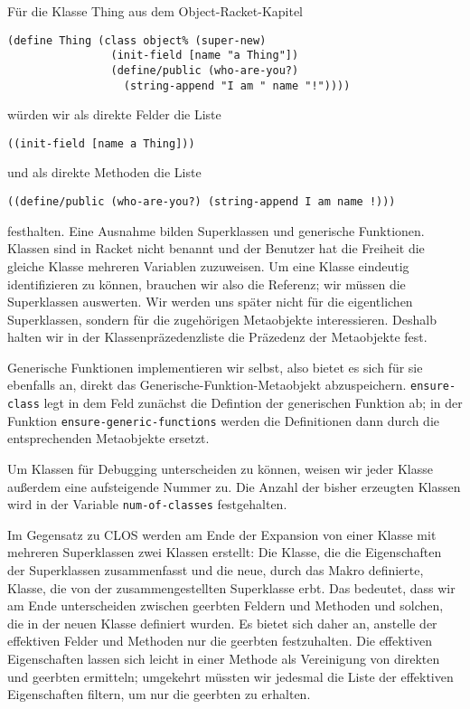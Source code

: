 Für die Klasse Thing aus dem Object-Racket-Kapitel

\begin{lstlisting}
(define Thing (class object% (super-new)
                (init-field [name "a Thing"])
                (define/public (who-are-you?) 
                  (string-append "I am " name "!"))))
\end{lstlisting}

würden wir als direkte Felder die Liste 

\texttt{{\textquotesingle}((init-field [name {\qq}a Thing\qq]))} 

und als direkte Methoden die Liste 

\texttt{{\textquotesingle}((define/public (who-are-you?) (string-append {\qq}I am {\qq} name \qq!\qq)))} 

festhalten. Eine Ausnahme bilden Superklassen und generische Funktionen. Klassen sind in Racket nicht benannt und der Benutzer hat die Freiheit die gleiche Klasse mehreren Variablen zuzuweisen. Um eine Klasse eindeutig identifizieren zu können, brauchen wir also die Referenz; wir müssen die Superklassen auswerten. Wir werden uns später nicht für die eigentlichen Superklassen, sondern für die zugehörigen Metaobjekte interessieren. Deshalb halten wir in der Klassenpräzedenzliste die Präzedenz der Metaobjekte fest. 

Generische Funktionen implementieren wir selbst, also bietet es sich für sie ebenfalls an, direkt das Generische-Funktion-Metaobjekt abzuspeichern. \texttt{ensure-class} legt in dem Feld zunächst die Defintion der generischen Funktion ab; in der Funktion \texttt{ensure-generic-functions} werden die Definitionen dann durch die entsprechenden Metaobjekte ersetzt.

Um Klassen für Debugging unterscheiden zu können, weisen wir jeder Klasse außerdem eine aufsteigende Nummer zu. Die Anzahl der bisher erzeugten Klassen wird in der Variable \texttt{num-of-classes} festgehalten.

Im Gegensatz zu CLOS werden am Ende der Expansion von einer Klasse mit mehreren Superklassen zwei Klassen erstellt: Die Klasse, die die Eigenschaften der Superklassen zusammenfasst und die neue, durch das Makro definierte, Klasse, die von der zusammengestellten Superklasse erbt. Das bedeutet, dass wir am Ende unterscheiden zwischen geerbten Feldern und Methoden und solchen, die in der neuen Klasse definiert wurden. Es bietet sich daher an, anstelle der effektiven Felder und Methoden nur die geerbten festzuhalten. Die effektiven Eigenschaften lassen sich leicht in einer Methode als Vereinigung von direkten und geerbten ermitteln; umgekehrt müssten wir jedesmal die Liste der effektiven Eigenschaften filtern, um nur die geerbten zu erhalten. 

